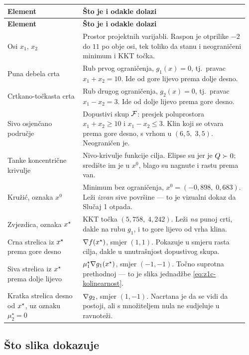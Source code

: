\begin{longtable}{@{}p{0.30\linewidth} p{0.66\linewidth}@{}}
\toprule
\textbf{Element} & \textbf{Što je i odakle dolazi} \\
\midrule
\endfirsthead
\toprule
\textbf{Element} & \textbf{Što je i odakle dolazi} \\
\midrule
\endhead
Osi $x_1$, $x_2$ & Prostor projektnih varijabli. Raspon je otprilike $-2$ do $11$
po obje osi, tek toliko da stanu i neograničeni minimum i KKT točka. \\[5pt]
Puna debela crta & Rub prvog ograničenja, $g_1(x) = 0$, tj.\ pravac
$x_1 + x_2 = 10$. Ide od gore lijevo prema dolje desno. \\[5pt]
Crtkano-točkasta crta & Rub drugog ograničenja, $g_2(x) = 0$, tj.\ pravac
$x_1 - x_2 = 3$. Ide od dolje lijevo prema gore desno. \\[5pt]
Sivo osjenčano područje & Dopustivi skup $\mathcal{F}$: presjek poluprostora
$x_1 + x_2 \geq 10$ i $x_1 - x_2 \leq 3$. Klin koji se otvara prema gore desno,
s vrhom u $(6{,}5,\; 3{,}5)$. Neograničen je. \\[5pt]
Tanke koncentrične krivulje & Nivo-krivulje funkcije cilja. Elipse su jer je
$Q \succ 0$; središte im je u $x^{0}$, blago su nagnute i rastu prema van. \\[5pt]
Kružić, oznaka $x^{0}$ & Minimum bez ograničenja,
$x^{0} = (-0{,}898,\; 0{,}683)$. Leži \emph{izvan} sive površine --- to je
vizualni dokaz da Slučaj 1 otpada. \\[5pt]
Zvjezdica, oznaka $x^{\star}$ & KKT točka $(5{,}758,\; 4{,}242)$. Leži \emph{na}
punoj crti, dakle na rubu $g_1$, i to gore lijevo od vrha klina. \\[5pt]
Crna strelica iz $x^{\star}$ prema gore desno & $\nabla f(x^{\star})$, smjer $(1,1)$.
Pokazuje u smjeru rasta cilja, dakle u unutrašnjost dopustivog skupa. \\[5pt]
Siva strelica iz $x^{\star}$ prema dolje lijevo & $\mu_1^{\star}\nabla g_1(x^{\star})$,
smjer $(-1,-1)$. Točno suprotna prethodnoj --- to je slika jednadžbe
\eqref{eq:z1c-kolinearnost}. \\[5pt]
Kratka strelica desno od $x^{\star}$, uz oznaku $\mu_2^{\star} = 0$ & $\nabla g_2$,
smjer $(1,-1)$. Nacrtana je da se vidi da postoji, ali s množiteljem nula ne
sudjeluje u ravnoteži. \\
\bottomrule
\end{longtable}

\subsection{Što slika dokazuje}

